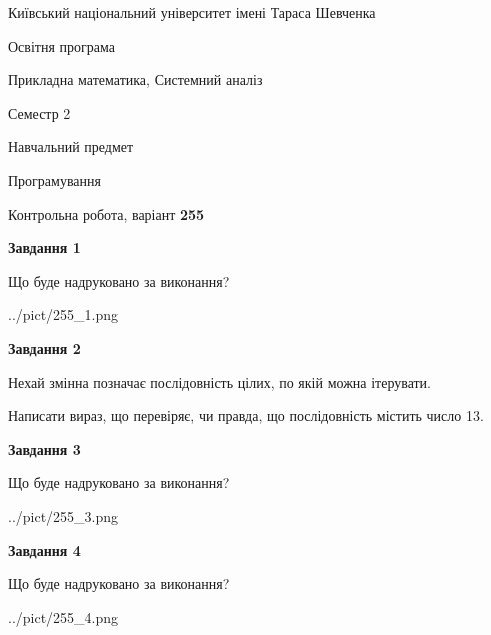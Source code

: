 \documentclass[12pt, ukrainian]{article}
\begin{document}
{{\begin {small}\par
{ \center  Київський національний університет імені Тараса Шевченка \par}
{\parbox {5 cm}{Освітня програма \hfill}{\parbox {8 cm}{Прикладна математика, Системний аналіз \hfill}}\parbox {5 cm}{\hfill Семестр 2}}\par
{\parbox {5 cm} {Навчальний предмет \hfill}\parbox {7 cm}{Програмування \hfill}\parbox {6cm}{\hfill}\par}\vspace{-7pt} \end{small}}{\center Контрольна робота, варіант  \No \textbf
{ 255 }\par}}
{
\begin {large}
{\begin {center}\textbf{Завдання 1}\end {center}}\par
Що буде надруковано за виконання?\par\par
\begin{center}
	{../pict/255_1.png}
\end{center}
\newpage

{\begin {center}\textbf{Завдання 2}\end {center}}\par
Нехай змінна  позначає послідовність цілих, по якій можна ітерувати.

Написати вираз, що перевіряє, чи правда, що послідовність  містить число 13.\par
\newpage

{\begin {center}\textbf{Завдання 3}\end {center}}\par
Що буде надруковано за виконання?
\begin{center}
	{../pict/255_3.png}
\end{center}
\newpage

{\begin {center}\textbf{Завдання 4}\end {center}}\par
Що буде надруковано за виконання?\par
\begin{center}
	{../pict/255_4.png}
\end{center}
\newpage


\end{large}}
\end{document}
